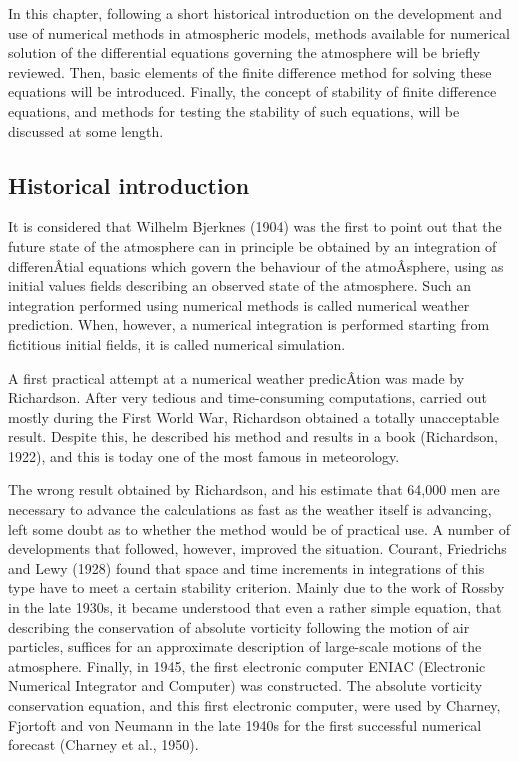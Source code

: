 In this chapter, following a short historical introduction on the
development and use of numerical methods in atmospheric models, methods
available for numerical solution of the differential equations governing
the atmosphere will be briefly reviewed. Then, basic elements of the
finite difference method for solving these equations will be introduced.
Finally, the concept of stability of finite difference equations, and
methods for testing the stability of such equations, will be discussed
at some length.

\subsection{\texorpdfstring{\textbf{Historical
introduction}}{Historical introduction}}\label{historical-introduction}

It is considered that Wilhelm Bjerknes (1904) was the first to point out
that the future state of the atmosphere can in principle be obtained by
an integration of differenÂ­tial equations which govern the behaviour of
the atmoÂ­sphere, using as initial values fields describing an observed
state of the atmosphere. Such an integration performed using numerical
methods is called numerical weather prediction. When, however, a
numerical integration is performed starting from fictitious initial
fields, it is called numerical simulation.

A first practical attempt at a numerical weather predicÂ­tion was made by
Richardson. After very tedious and time-consuming computations, carried
out mostly during the First World War, Richardson obtained a totally
unacceptable result. Despite this, he described his method and results
in a book (Richardson, 1922), and this is today one of the most famous
in meteorology.

The wrong result obtained by Richardson, and his estimate that 64,000
men are necessary to advance the calculations as fast as the weather
itself is advancing, left some doubt as to whether the method would be
of practical use. A number of developments that followed, however,
improved the situation. Courant, Friedrichs and Lewy (1928) found that
space and time increments in integrations of this type have to meet a
certain stability criterion. Mainly due to the work of Rossby in the
late 1930\textquotesingle s, it became understood that even a rather
simple equation, that describing the conservation of absolute vorticity
following the motion of air particles, suffices for an approximate
description of large-scale motions of the atmosphere. Finally, in 1945,
the first electronic computer ENIAC (Electronic Numerical Integrator and
Computer) was constructed. The absolute vorticity conservation equation,
and this first electronic computer, were used by Charney, Fjortoft and
von Neumann in the late 1940\textquotesingle s for the first successful
numerical forecast (Charney et al., 1950).


